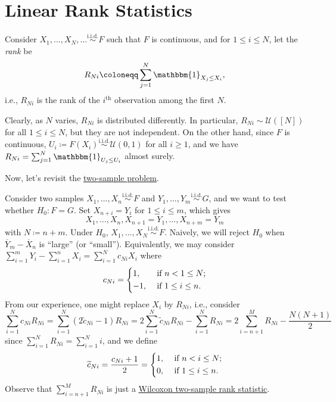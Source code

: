 \section{Linear Rank Statistics}
Consider \(X_1, \dots , X_N, \dots \overset{\text{i.i.d.} }{\sim } F\) such that \(F\) is continuous, and for \(1 \leq i \leq N\), let the \emph{rank} be
\[
	R_{Ni}
	\coloneqq \sum_{j=1}^{N} \mathbbm{1}_{X_j \leq X_i},
\]
i.e., \(R_{Ni}\) is the rank of the \(i^{\text{th} }\) observation among the first \(N\).

\begin{remark}
	Clearly, as \(N\) varies, \(R_{Ni}\) is distributed differently. In particular, \(R_{Ni} \sim \mathcal{U} ([N])\) for all \(1 \leq i \leq N\), but they are not independent. On the other hand, since \(F\) is continuous, \(U_i \coloneqq F(X_i)\overset{\text{i.i.d.} }{\sim } \mathcal{U} (0, 1)\) for all \(i \geq 1\), and we have \(R_{Ni} = \sum_{j=1}^{N} \mathbbm{1}_{U_j \leq U_i} \) almost surely.
\end{remark}

Now, let's revisit the \hyperref[prb:two-sample]{two-sample problem}.

\begin{eg}
	Consider two samples \(X_1, \dots , X_n \overset{\text{i.i.d.} }{\sim } F\) and \(Y_1, \dots , Y_m \overset{\text{i.i.d.} }{\sim } G\), and we want to test whether \(H_0 \colon F = G\). Set \(X_{n+i} = Y_i\) for \(1 \leq i \leq m\), which gives
	\[
		X_1, \dots , X_n , X_{n+1} = Y_1, \dots , X_{n+m} = Y_m
	\]
	with \(N \coloneqq n + m\). Under \(H_0\), \(X_1, \dots , X_N \overset{\text{i.i.d.} }{\sim } F\). Naively, we will reject \(H_0\) when \(\overline{Y} _m - \overline{X} _n\) is ``large'' (or ``small''). Equivalently, we may consider \(\sum_{i=1}^{m} Y_i - \sum_{i=1}^{n} X_i = \sum_{i=1}^{N} c_{Ni} X_i\) where
	\[
		c_{Ni}
		= \begin{dcases}
			1,  & \text{ if } n < 1 \leq N ;   \\
			-1, & \text{ if } 1 \leq i \leq n.
		\end{dcases}
	\]
	From our experience, one might replace \(X_i\) by \(R_{Ni}\), i.e., consider
	\[
		\sum_{i=1}^{N} c_{Ni} R_{Ni}
		= \sum_{i=1}^{N} (2 \widetilde{c} _{Ni} - 1) R_{Ni}
		= 2 \sum_{i=1}^{N} \widetilde{c} _{Ni} R_{Ni} - \sum_{i=1}^{N} R_{Ni}
		= 2 \sum_{i=n+1}^{M} R_{Ni} - \frac{N(N+1)}{2}
	\]
	since \(\sum_{i=1}^{N} R_{Ni} = \sum_{i=1}^{N} i\), and we define
	\[
		\widetilde{c} _{Ni}
		= \frac{c_{Ni} + 1}{2}
		= \begin{dcases}
			1, & \text{ if } n < i \leq N ;   \\
			0, & \text{ if } 1 \leq i \leq n.
		\end{dcases}
	\]
	Observe that \(\sum_{i=n+1}^{M} R_{Ni}\) is just a \hyperref[def:Wilcoxon-signed-rank-statistic]{Wilcoxon two-sample rank statistic}.
\end{eg}


